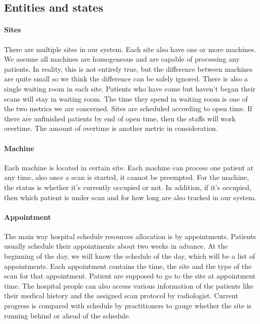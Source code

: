 \subsection{Entities and states}

\paragraph{Sites} There are multiple sites in our system. Each site also have one or more machines. We assume all machines are homogeneous and are capable of processing any patients. In reality, this is not entirely true, but the difference between machines are quite small so we think the difference can be safely ignored. There is also a single waiting room in each site. Patients who have come but haven't began their scans will stay in waiting room. The time they spend in waiting room is one of the two metrics we are concerned. Sites are scheduled according to open time. If there are unfinished patients by end of open time, then the staffs will work overtime. The amount of overtime is another metric in consideration.

\paragraph{Machine} Each machine is located in certain site. Each machine can process one patient at any time, also once a scan is started, it cannot be preempted. For the machine, the status is whether it's currently occupied or not. In addition, if it's occupied, then which patient is under scan and for how long are also tracked in our system.

\paragraph{Appointment} The main way hospital schedule resources allocation is by appointments. Patients usually schedule their appointments about two weeks in advance. At the beginning of the day, we will know the schedule of the day, which will be a list of appointments. Each appointment contains the time, the site and the type of the scan for that appointment. Patient are supposed to go to the site at appointment time. The hospital people can also access various information of the patients like their medical history and the assigned scan protocol by radiologist. Current progress is compared with schedule by practitioners to gauge whether the site is running behind or ahead of the schedule.

